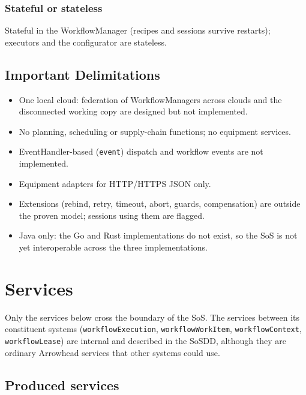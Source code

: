 \documentclass[a4paper]{arrowhead}
\begin{document}
\subsubsection{Stateful or stateless}
Stateful in the WorkflowManager (recipes and sessions survive restarts); executors and the configurator are stateless.

\subsection{Important Delimitations}
\label{sec:delimitations}
\begin{itemize}
\item One local cloud: federation of WorkflowManagers across clouds and the disconnected working copy are designed but
not implemented.
\item No planning, scheduling or supply-chain functions; no equipment services.
\item EventHandler-based (\texttt{event}) dispatch and workflow events are not implemented.
\item Equipment adapters for HTTP/HTTPS JSON only.
\item Extensions (rebind, retry, timeout, abort, guards, compensation) are outside the proven model; sessions using them are
flagged.
\item Java only: the Go and Rust implementations do not exist, so the SoS is not yet interoperable across the three
implementations.
\end{itemize}

\newpage
\section{Services}
\label{sec:services}
Only the services below cross the boundary of the SoS. The services between its constituent systems
(\texttt{workflow\allowbreak{}Execution}, \texttt{workflow\allowbreak{}Work\allowbreak{}Item}, \texttt{workflow\allowbreak{}Context}, \texttt{workflowLease}) are internal and
described in the SoSDD, although they are ordinary Arrowhead services that other systems could use.

\subsection{Produced services}
\end{document}
